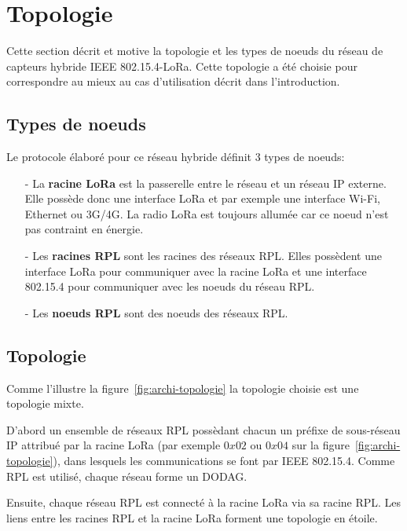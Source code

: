 \section{Topologie}\label{sec:archi-topologie}
\renewcommand{\rightmark}{Topologie}

Cette section décrit et motive la topologie et les types de noeuds du réseau de capteurs hybride IEEE 802.15.4-LoRa. Cette topologie a été choisie pour correspondre au mieux au cas d'utilisation décrit dans l'introduction.

\subsection*{Types de noeuds}
    Le protocole élaboré pour ce réseau hybride définit 3 types de noeuds:
    \begin{itemize}
        \item[-] La \textbf{racine LoRa} est la passerelle entre le réseau et un réseau IP externe. Elle possède donc une interface LoRa et par exemple une interface Wi-Fi, Ethernet ou 3G/4G.
        La radio LoRa est toujours allumée car ce noeud n'est pas contraint en énergie.  
        \item[-] Les \textbf{racines RPL} sont les racines des réseaux RPL. Elles possèdent une interface LoRa pour communiquer avec la racine LoRa et une interface 802.15.4 pour communiquer avec les noeuds du réseau RPL.
        \item[-] Les \textbf{noeuds RPL} sont des noeuds des réseaux RPL.
    \end{itemize}

\subsection*{Topologie}
Comme l'illustre la figure~\ref{fig:archi-topologie} la topologie choisie est une topologie mixte.

D'abord un ensemble de réseaux RPL possèdant chacun un préfixe de sous-réseau IP attribué par la racine LoRa (par exemple $0x02$ ou $0x04$ sur la figure~\ref{fig:archi-topologie}), dans lesquels les communications se font par IEEE 802.15.4.
Comme RPL est utilisé, chaque réseau forme un DODAG.

Ensuite, chaque réseau RPL est connecté à la racine LoRa via sa racine RPL. Les liens entre les racines RPL et la racine LoRa forment une topologie en étoile.


